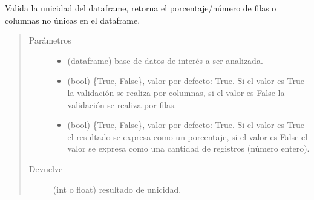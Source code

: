 \documentclass[letterpaper,10pt,openany,spanish]{sphinxmanual}
\begin{document}
\begin{fulllineitems}
\label{\detokenize{datos:datos.nounicos}}
Valida la unicidad del dataframe, retorna el porcentaje/número de filas o columnas no únicas en el dataframe.
\begin{quote}\begin{description}
\item[{Parámetros}] \leavevmode\begin{itemize}
\item {} 
 \textendash{} (dataframe) base de datos de interés a ser analizada.

\item {} 
 \textendash{} (bool) \{True, False\}, valor por defecto: True. Si el valor es True la validación se realiza por columnas, si el valor es False la validación se realiza por filas.

\item {} 
 \textendash{} (bool) \{True, False\}, valor por defecto: True. Si el valor es True el resultado se expresa como un porcentaje, si el valor es False el valor se expresa como una cantidad de registros (número entero).

\end{itemize}

\item[{Devuelve}] \leavevmode
(int o float) resultado de unicidad.

\end{description}\end{quote}

\end{fulllineitems}

\end{document}
